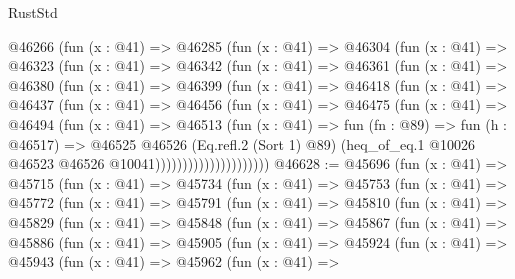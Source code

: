 \begin{lexlean}{RustStd}
\begin{coremodule}
              @46266
                (fun (x : @41) =>
                @46285
                  (fun (x : @41) =>
                  @46304
                    (fun (x : @41) =>
                    @46323
                      (fun (x : @41) =>
                      @46342
                        (fun (x : @41) =>
                        @46361
                          (fun (x : @41) =>
                          @46380
                            (fun (x : @41) =>
                            @46399
                              (fun (x : @41) =>
                              @46418
                                (fun (x : @41) =>
                                @46437
                                  (fun (x : @41) =>
                                  @46456
                                    (fun (x : @41) =>
                                    @46475
                                      (fun (x : @41) =>
                                      @46494
                                        (fun (x : @41) =>
                                        @46513
                                          (fun (x : @41) =>
                                          fun (fn : @89) =>
                                          fun (h : @46517) =>
                                          @46525
                                            @46526
                                            (Eq.refl.{2} (Sort 1) @89)
                                            (heq_of_eq.{1}
                                              @10026
                                              @46523
                                              @46526
                                              @10041)))))))))))))))))))))
@46628 := @45696
    (fun (x : @41) =>
    @45715
      (fun (x : @41) =>
      @45734
        (fun (x : @41) =>
        @45753
          (fun (x : @41) =>
          @45772
            (fun (x : @41) =>
            @45791
              (fun (x : @41) =>
              @45810
                (fun (x : @41) =>
                @45829
                  (fun (x : @41) =>
                  @45848
                    (fun (x : @41) =>
                    @45867
                      (fun (x : @41) =>
                      @45886
                        (fun (x : @41) =>
                        @45905
                          (fun (x : @41) =>
                          @45924
                            (fun (x : @41) =>
                            @45943
                              (fun (x : @41) =>
                              @45962
                                (fun (x : @41) =>

\end{coremodule}
\end{lexlean}
